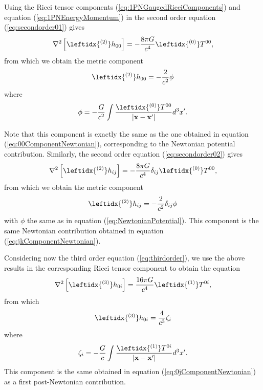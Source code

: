 Using the Ricci tensor components (\ref{eq:1PNGaugedRicciComponents}) and equation (\ref{eq:1PNEnergyMomentum}) in the second order equation (\ref{eq:secondorder01}) gives
\begin{equation}
\nabla^2 \left[ \leftidx{^{(2)}} h_{00} \right] = - \frac{8\pi G}{c^4} \leftidx{^{(0)}}T^{00} ,
\end{equation}
from which we obtain the metric component
\begin{equation}
\leftidx{^{(2)}} h_{00} = -\frac{2}{c^2} \phi
\end{equation}
where 
\begin{equation}
\phi = - \frac{G}{c^2} \int \frac{\leftidx{^{(0)}}T^{00}}{\left|  \textbf{x} - \textbf{x}' \right|} d^3 x'. \label{eq:NewtonianPotential}
\end{equation}

Note that this component is exactly the same as the one obtained in equation (\ref{eq:00ComponentNewtonian}), corresponding to the Newtonian potential contribution. Similarly, the second order equation (\ref{eq:secondorder02}) gives
\begin{equation}
\nabla^2 \left[ \leftidx{^{(2)}} h_{ij} \right] = - \frac{8\pi G}{c^4} \delta_{ij} \leftidx{^{(0)}}T^{00} ,
\end{equation}
from which we obtain the metric component
\begin{equation}
\leftidx{^{(2)}} h_{ij} = -\frac{2}{c^2} \delta_{ij} \phi
\end{equation}
with $\phi$ the same as in equation  (\ref{eq:NewtonianPotential}). This component is the same Newtonian contribution obtained in equation (\ref{eq:jkComponentNewtonian}).

Considering now the third order equation (\ref{eq:thirdorder}), we use the above results in the corresponding Ricci tensor component to obtain the equation
\begin{equation}
\nabla^2 \left[ \leftidx{^{(3)}} h_{0i} \right] =  \frac{16\pi G}{c^4}  \leftidx{^{(1)}}T^{0i} ,
\end{equation}
from which
\begin{equation}
\leftidx{^{(3)}} h_{0i} = \frac{4}{c^3} \zeta_i
\end{equation}
where 
\begin{equation}
\zeta_i = - \frac{G}{c} \int \frac{\leftidx{^{(1)}}T^{0i}}{\left|  \textbf{x} - \textbf{x}' \right|} d^3 x'. 
\end{equation}
This component is the same  obtained in equation (\ref{eq:0jComponentNewtonian}) as a first post-Newtonian contribution. 

